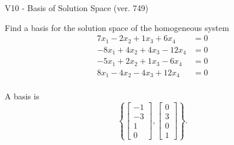 \begin{exercise}
  \begin{exerciseTitle}V10 - Basis of Solution Space (ver. 749)\end{exerciseTitle}
  \begin{exerciseStatement}
    Find a basis for the solution space of the homogeneous system 
\begin{align*}
 7 x_ 1 -2 x_ 2 + 1 x_ 3 + 6 x_ 4 &= 0  \\ 
  -8 x_ 1 + 4 x_ 2 + 4 x_ 3 -12 x_ 4 &= 0  \\ 
  -5 x_ 1 + 2 x_ 2 + 1 x_ 3 -6 x_ 4 &= 0  \\ 
  8 x_ 1 -4 x_ 2 -4 x_ 3 + 12 x_ 4 &= 0  \\ 
 \end{align*}


 
  \end{exerciseStatement}

  \begin{exerciseAnswer}
   A basis is   
\[\left\{\left[\begin{array}{c}
-1 \\
-3 \\
1 \\
0
\end{array}\right] , \left[\begin{array}{c}
0 \\
3 \\
0 \\
1
\end{array}\right]\right\}.\]

  


  \end{exerciseAnswer}
\end{exercise}
